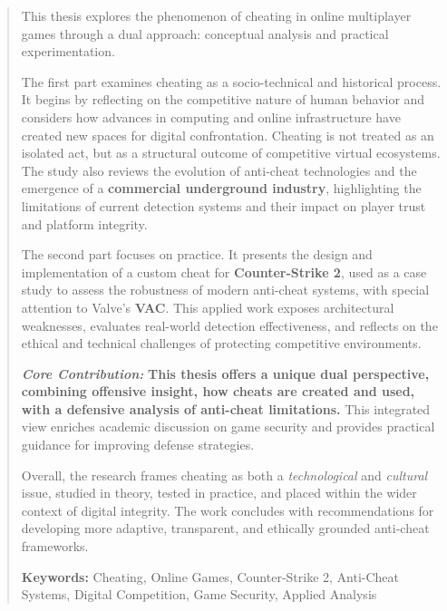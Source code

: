 \documentclass[12pt]{report}
\begin{document}
\begin{abstract}
\thispagestyle{plain}
\setcounter{page}{3}

This thesis explores the phenomenon of cheating in online multiplayer games through a dual approach: conceptual analysis and practical experimentation.

The first part examines cheating as a socio-technical and historical process. It begins by reflecting on the competitive nature of human behavior and considers how advances in computing and online infrastructure have created new spaces for digital confrontation. Cheating is not treated as an isolated act, but as a structural outcome of competitive virtual ecosystems. The study also reviews the evolution of anti-cheat technologies and the emergence of a \textbf{commercial underground industry}, highlighting the limitations of current detection systems and their impact on player trust and platform integrity.

The second part focuses on practice. It presents the design and implementation of a custom cheat for \textbf{Counter-Strike 2}, used as a case study to assess the robustness of modern anti-cheat systems, with special attention to Valve's \textbf{VAC}. This applied work exposes architectural weaknesses, evaluates real-world detection effectiveness, and reflects on the ethical and technical challenges of protecting competitive environments.

\medskip
\noindent
{\sffamily\bfseries\itshape Core Contribution:} {\sffamily\bfseries This thesis offers a unique dual perspective, combining offensive insight, how cheats are created and used, with a defensive analysis of anti-cheat limitations.} This integrated view enriches academic discussion on game security and provides practical guidance for improving defense strategies.

\medskip
Overall, the research frames cheating as both a \textit{technological} and \textit{cultural} issue, studied in theory, tested in practice, and placed within the wider context of digital integrity. The work concludes with recommendations for developing more adaptive, transparent, and ethically grounded anti-cheat frameworks.

\textbf{Keywords:} Cheating, Online Games, Counter-Strike 2, Anti-Cheat Systems, Digital Competition, Game Security, Applied Analysis
\end{abstract}

\end{document}
